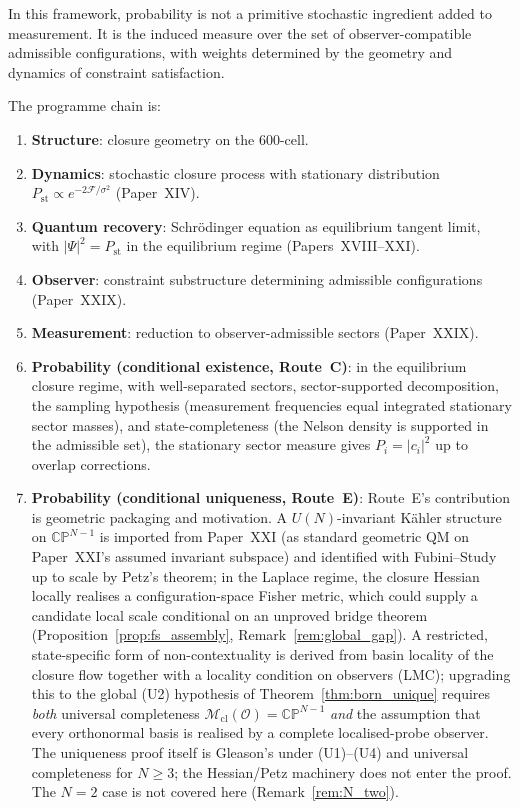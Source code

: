 \documentclass[12pt]{article}
\newcommand{\Fcal}{\mathcal{F}}
\newcommand{\Ocal}{\mathcal{O}}
\newcommand{\Mcl}{\mathcal{M}_{\mathrm{cl}}}
\newcommand{\Pst}{P_{\mathrm{st}}}
\begin{document}
In this framework, probability is not a primitive stochastic ingredient added to measurement. It is the induced measure over the set of observer-compatible admissible configurations, with weights determined by the geometry and dynamics of constraint satisfaction.

The programme chain is:
\begin{enumerate}
    \item \textbf{Structure}: closure geometry on the 600-cell.
    \item \textbf{Dynamics}: stochastic closure process with stationary distribution $\Pst \propto e^{-2\Fcal/\sigma^2}$ (Paper~XIV).
    \item \textbf{Quantum recovery}: Schr\"odinger equation as equilibrium tangent limit, with $|\Psi|^2 = \Pst$ in the equilibrium regime (Papers~XVIII--XXI).
    \item \textbf{Observer}: constraint substructure determining admissible configurations (Paper~XXIX).
    \item \textbf{Measurement}: reduction to observer-admissible sectors (Paper~XXIX).
    \item \textbf{Probability (conditional existence, Route~C)}: in the equilibrium closure regime, with well-separated sectors, sector-supported decomposition, the sampling hypothesis (measurement frequencies equal integrated stationary sector masses), and state-completeness (the Nelson density is supported in the admissible set), the stationary sector measure gives $P_i = |c_i|^2$ up to overlap corrections.
    \item \textbf{Probability (conditional uniqueness, Route~E)}: Route~E's contribution is geometric packaging and motivation. A $U(N)$-invariant K\"ahler structure on $\mathbb{CP}^{N-1}$ is imported from Paper~XXI (as standard geometric QM on Paper~XXI's assumed invariant subspace) and identified with Fubini--Study up to scale by Petz's theorem; in the Laplace regime, the closure Hessian locally realises a configuration-space Fisher metric, which could supply a candidate local scale conditional on an unproved bridge theorem (Proposition~\ref{prop:fs_assembly}, Remark~\ref{rem:global_gap}). A restricted, state-specific form of non-contextuality is derived from basin locality of the closure flow together with a locality condition on observers (LMC); upgrading this to the global (U2) hypothesis of Theorem~\ref{thm:born_unique} requires \emph{both} universal completeness $\Mcl(\Ocal) = \mathbb{CP}^{N-1}$ \emph{and} the assumption that every orthonormal basis is realised by a complete localised-probe observer. The uniqueness proof itself is Gleason's under (U1)--(U4) and universal completeness for $N \geq 3$; the Hessian/Petz machinery does not enter the proof. The $N = 2$ case is not covered here (Remark~\ref{rem:N_two}).
\end{enumerate}
\end{document}

